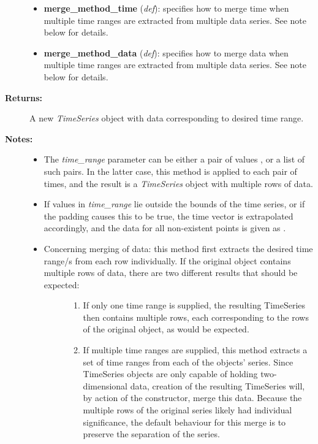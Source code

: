 \documentclass[letterpaper,10pt,english]{sphinxmanual}
\begin{document}
\begin{fulllineitems}
\begin{fulllineitems}
\begin{description}
\begin{itemize}
\item {} 
\textbf{merge\_method\_time} (\emph{def}): specifies how to merge time when multiple time ranges are extracted from multiple data series. See note below for details.

\item {} 
\textbf{merge\_method\_data} (\emph{def}): specifies how to merge data when multiple time ranges are extracted from multiple data series. See note below for details.

\end{itemize}

\item[{\textbf{Returns:}}] \leavevmode
A new \emph{TimeSeries} object with data corresponding to desired time range.

\item[{\textbf{Notes:}}] \leavevmode\begin{itemize}
\item {} 
The \emph{time\_range} parameter can be either a pair of values , or a list of such pairs. In the latter case, this method is applied to each pair of times, and the result is a \emph{TimeSeries} object with multiple rows of data.

\item {} 
If values in \emph{time\_range} lie outside the bounds of the time series, or if the padding causes this to be true, the time vector is extrapolated accordingly, and the data for all non-existent points is given as .

\item {} \begin{description}
\item[{Concerning merging of data: this method first extracts the desired time range/s from each row individually. If the original object contains multiple rows of data, there are two different results that should be expected: }] \leavevmode\begin{enumerate}
\item {} 
If only one time range is supplied, the resulting TimeSeries then contains multiple rows, each corresponding to the rows of the original object, as would be expected.

\item {} 
If multiple time ranges are supplied, this method extracts a set of time ranges from each of the objects' series. Since TimeSeries objects are only capable of holding two-dimensional data, creation of the resulting TimeSeries will, by action of the constructor, merge this data. Because the multiple rows of the original series likely had individual significance, the default behaviour for this merge is to preserve the separation of the series.


\end{enumerate}
\end{description}
\end{itemize}
\end{description}
\end{fulllineitems}
\end{fulllineitems}
\end{document}
